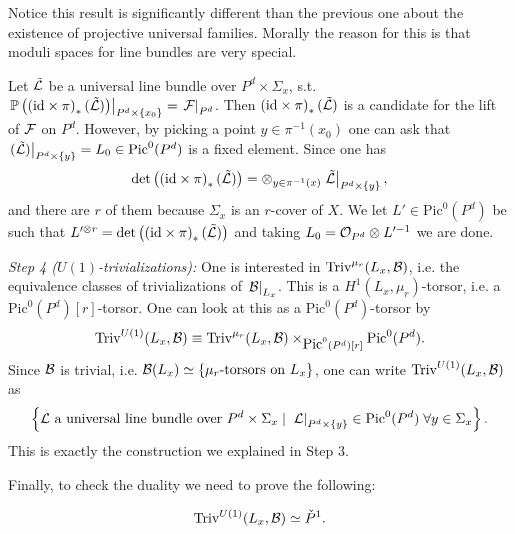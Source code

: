 \begin{rem*}
Notice this result is significantly different than the previous one
about the existence of projective universal families. Morally the
reason for this is that moduli spaces for line bundles are very
special.
\end{rem*}

Let $\tilde{\mathcal{L}}$ be a universal line bundle over $P^d\times
\Sigma_x$, s.t. $\left.\mathbb{P}\left(\left(\mbox{id}\times
    \pi\right)_*(\tilde{\mathcal{L}})\right)\right|_{P^d\times\{x_0\}} =
\left.\mathcal{F}\right|_{P^d}$. Then $\left(\mbox{id}\times
  \pi\right)_*(\tilde{\mathcal{L}})$ is a candidate for the lift of $\mathcal{F}$ on
$P^d$. However, by picking a point $y \in \pi^{-1}(x_0)$ one can ask
that $\left.(\tilde{\mathcal{L}})\right|_{P^d\times\{y\}} = L_0 \in
\mbox{Pic}^0(P^d)$ is a fixed element. Since one has
\[\det\left(\left(\mbox{id}\times\pi\right)_*(\tilde{\mathcal{L}})\right) =
\otimes_{y \in \pi^{-1}(x)}\left.\tilde{\mathcal{L}}\right|_{P^d\times\{y\}},\]
and there are $r$ of them because $\Sigma_x$ is an $r$-cover of
$X$. We let $L' \in \mbox{Pic}^0(P^d)$ be such that $L'^{\otimes r} =
\det\left(\left(\mbox{id}\times\pi\right)_*(\tilde{\mathcal{L}})\right)$ and
taking $L_0 = \mathcal{O}_{P^d}\otimes L'^{-1}$ we are done.

\textit{Step 4 ($U(1)$-trivializations):}
One is interested in $\mbox{Triv}^{\mu_r}(L_x,\mathcal{B})$, i.e. the
equivalence classes of trivializations of
$\left.\mathcal{B}\right|_{L_x}$. This is a $H^1(L_x,\mu_r)$-torsor, i.e. a
$\mbox{Pic}^0(P^d)[r]$-torsor. 
One can look at this as a $\mbox{Pic}^0(P^d)$-torsor by
\[\mbox{Triv}^{U(1)}(L_x,\mathcal{B}) \equiv
\mbox{Triv}^{\mu_r}(L_x,\mathcal{B})\times_{\mbox{Pic}^0(P^d)[r]}\mbox{Pic}^0(P^d).\]
Since $\mathcal{B}$ is trivial, i.e. $\mathcal{B}(L_x) \simeq \left\{\mu_r\mbox{-torsors on
  }L_x\right\}$, one can write $\mbox{Triv}^{U(1)}(L_x,\mathcal{B})$ as
\[\left\{\mathcal{L}\mbox{ a universal line bundle over }P^d\times\Sigma_x \;
  | \; \left.\mathcal{L}\right|_{P^d\times\{y\}}\in \mbox{Pic}^0(P^d) \;
  \forall y \in \Sigma_x\right\}.\]
This is exactly the construction we explained in Step 3.

Finally, to check the duality we need to prove the following:
\begin{lem}
\[\mbox{Triv}^{U(1)}(L_x,\mathcal{B}) \simeq \check{P}^1.\]
\end{lem}

